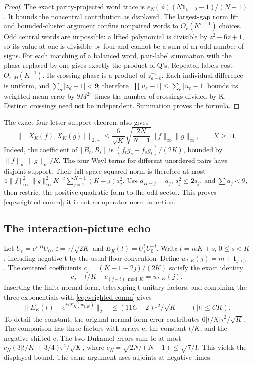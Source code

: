 \begin{proof}
The exact parity-projected word trace is
$e_N(\phi)(N\mathbf1_{v=0}-1)/(N-1)$. It bounds the noncentral contribution
as displayed. The largest-gap norm lift and bounded-cluster argument confine
nonpaired words to $O_r(K^{r-1})$ choices. Odd central words are impossible:
a lifted polynomial is divisible by $z^2-6z+1$, so its value at one is
divisible by four and cannot be a sum of an odd number of signs.
For each matching of a balanced word, pair-label summation with the phase
replaced by one gives exactly the product of Q's. Repeated labels cost
$O_{r,M}(K^{-1})$. Its crossing phase is a product of $z_{a-b}^{\pm1}$.
Each individual difference is uniform, and $\sum_d|z_d-1|<9$; therefore
$|\prod u_e-1|\leq\sum_e|u_e-1|$ bounds its weighted mean error by
$9M^{2r}$ times the number of crossings divided by K. Distinct crossings
need not be independent. Summation proves the formula.
\end{proof}
The exact four-letter support theorem also gives
\begin{equation}\label{eq:weighted-comm}
 \|[X_K(f),X_K(g)]\|_{2,-}
 \leq\frac{6}{\sqrt K}\sqrt{\frac{2N}{N-1}}
                   \|f\|_\infty\|g\|_\infty,\qquad K\geq11.
\end{equation}
Indeed, the coefficient of $[B_t,B_s]$ is
$(f_tg_s-f_sg_t)/(2K)$, bounded by $\|f\|_\infty\|g\|_\infty/K$.
The four Weyl terms for different unordered pairs have disjoint support.
Their full-space squared norm is therefore at most
$4\|f\|_\infty^2\|g\|_\infty^2K^{-2}\sum_{j=1}^{K-1}(K-j)a_j^2$.
Use $a_{K-j}=a_j$, $a_j^2\leq2a_j$, and $\sum a_j<9$, then restrict the
positive quadratic form to the odd sector. This proves
\eqref{eq:weighted-comm}; it is not an operator-norm assertion.

\subsection{The interaction-picture echo}
Let $U_\varepsilon=e^{i\varepsilon B}U_0$,
$\varepsilon=\tau/\sqrt{2K}$ and $E_K(t)=U_\varepsilon^tU_0^{-t}$.
Write $t=mK+s$, $0\leq s<K$, including negative t by the usual floor
convention. Define $w_{t,K}(j)=m+\mathbf1_{j<s}$.
The centered coefficients $c_j=(K-1-2j)/(2K)$ satisfy the exact identity
\[
 c_j+t/K-c_{(j-t)\bmod K}=w_{t,K}(j).
\]
Inserting the finite normal form, telescoping t unitary factors, and combining
the three exponentials with \eqref{eq:weighted-comm} gives
\begin{equation}\label{eq:echo-finite}
 \|E_K(t)-e^{i\tau X_K(w_{t,K})}\|_{2,-}
       \leq (11C+2)\tau^2/\sqrt K\qquad(|t|\leq CK).
\end{equation}
To detail the constant, the original normal-form error contributes
$6|t/K|\tau^2/\sqrt K$. The comparison has three factors with arrays c,
the constant $t/K$, and the negative shifted c. The two Duhamel errors sum
to at most $c_N(3|t/K|+3/4)\tau^2/\sqrt K$, where
$c_N=\sqrt{2N/(N-1)}\leq\sqrt{7/3}$. This yields the displayed bound.
The same argument uses adjoints at negative times.

